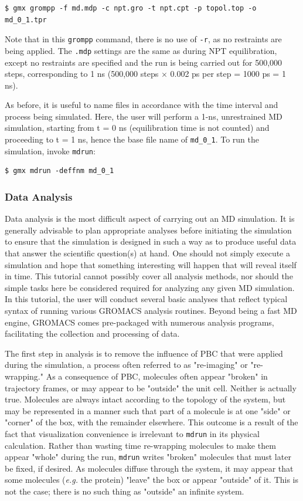 \documentclass[9pt,tutorial,pubversion]{livecoms}
\begin{document}
\begin{lstlisting}
$ gmx grompp -f md.mdp -c npt.gro -t npt.cpt -p topol.top -o md_0_1.tpr
\end{lstlisting}
%
Note that in this \texttt{grompp} command, there is no use of \texttt{-r}, as no restraints are being applied. The \texttt{.mdp} settings are the same as during NPT equilibration, except no restraints are specified and the run is being carried out for 500,000 steps, corresponding to 1 ns (500,000 steps $\times$ 0.002 ps per step = 1000 ps = 1 ns).

As before, it is useful to name files in accordance with the time interval and process being simulated. Here, the user will perform a 1-ns, unrestrained MD simulation, starting from t = 0 ns (equilibration time is not counted) and proceeding to t = 1 ns, hence the base file name of \texttt{md\_0\_1}. To run the simulation, invoke \texttt{mdrun}:

\begin{lstlisting}
$ gmx mdrun -deffnm md_0_1
\end{lstlisting}

\subsubsection{Data Analysis} \label{lyso_ana}

Data analysis is the most difficult aspect of carrying out an MD simulation. It is generally advisable to plan appropriate analyses before initiating the simulation to ensure that the simulation is designed in such a way as to produce useful data that answer the scientific question(s) at hand. One should not simply execute a simulation and hope that something interesting will happen that will reveal itself in time. This tutorial cannot possibly cover all analysis methods, nor should the simple tasks here be considered required for analyzing any given MD simulation. In this tutorial, the user will conduct several basic analyses that reflect typical syntax of running various GROMACS analysis routines. Beyond being a fast MD engine, GROMACS comes pre-packaged with numerous analysis programs, facilitating the collection and processing of data.

The first step in analysis is to remove the influence of PBC that were applied during the simulation, a process often referred to as "re-imaging" or "re-wrapping." As a consequence of PBC, molecules often appear "broken" in trajectory frames, or may appear to be "outside" the unit cell. Neither is actually true. Molecules are always intact according to the topology of the system, but may be represented in a manner such that part of a molecule is at one "side" or "corner" of the box, with the remainder elsewhere. This outcome is a result of the fact that visualization convenience is irrelevant to \texttt{mdrun} in its physical calculation. Rather than wasting time re-wrapping molecules to make them appear "whole" during the run, \texttt{mdrun} writes "broken" molecules that must later be fixed, if desired. As molecules diffuse through the system, it may appear that some molecules ({\em e.g.} the protein) "leave" the box or appear "outside" of it. This is not the case; there is no such thing as "outside" an infinite system.
\end{document}
